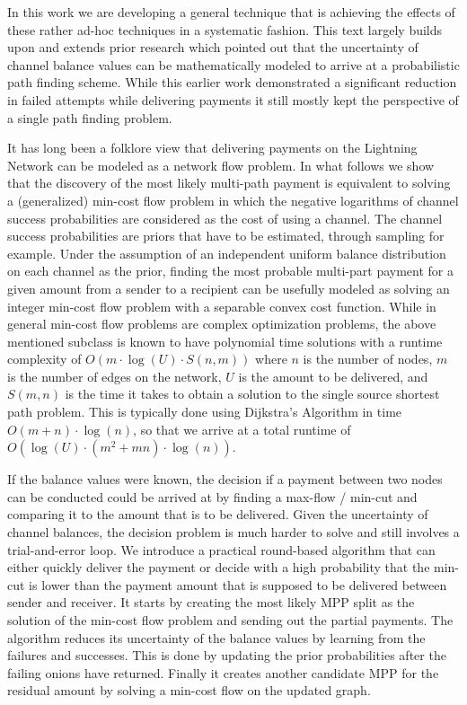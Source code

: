 \documentclass[10pt,twocolumn]{article}
\begin{document}
In this work we are developing a general technique that is achieving the effects of these rather ad-hoc techniques in a systematic fashion.
This text largely builds upon and extends prior research which pointed out that
the uncertainty of channel balance values can be mathematically modeled to
arrive at a probabilistic path finding scheme\cite{pickhardt2021security}. While
this earlier work demonstrated a significant reduction in failed attempts while
delivering payments it still mostly kept the perspective of a single path finding
problem.

It has long been a folklore view that delivering payments on the Lightning Network can be modeled as a network flow problem.
In what follows we show that the discovery of the most likely multi-path payment is equivalent to solving a (generalized) min-cost flow problem in which the negative logarithms of channel success probabilities are considered as the cost of using a channel.
The channel success probabilities are priors that have to be estimated, through sampling for example.
Under the assumption of an independent uniform balance distribution on each channel as the prior, finding the most probable multi-part payment for a given amount from a sender to a recipient can be usefully modeled as solving an integer min-cost flow problem with a separable convex cost function.
While in general min-cost flow problems are complex
optimization problems, the above mentioned subclass is known to have polynomial
time solutions with a runtime complexity of $O(m \cdot \log(U) \cdot S(n,m))$
where $n$ is the number of nodes, $m$ is the number of edges on the network, $U$
is the amount to be delivered, and $S(m,n)$ is the time it takes to obtain a
solution to the single source shortest path problem\cite{Minoux1986,ahuja1993network}. This
is typically done using Dijkstra's Algorithm in time $O(m+n) \cdot \log(n)$, so
that we arrive at a total runtime of $O(\log(U)\cdot(m^2+mn)\cdot\log(n))$.

If the balance values were known, the decision if a payment between two nodes can be conducted could be arrived at by finding a max-flow / min-cut and comparing it to the amount that is to be delivered.
Given the uncertainty of channel balances, the decision problem is much harder to solve and still involves a trial-and-error loop.
We introduce a practical round-based algorithm that can either quickly deliver the payment or decide with a high probability that the min-cut is lower than the payment amount that is supposed to be delivered between sender and receiver.
It starts by creating the most likely MPP split as the solution of the min-cost flow problem and sending out the partial payments.
The algorithm reduces its uncertainty of the balance values by learning from the failures and successes.
This is done by updating the prior probabilities after the failing onions have returned.
Finally it creates another candidate MPP for the residual amount by solving a min-cost flow on the updated graph.
\end{document}
